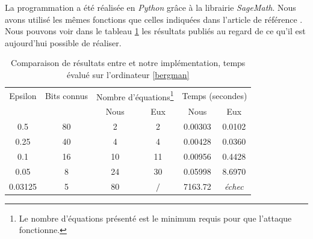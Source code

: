 \documentclass{backend}
\begin{document}
\medbreak

La programmation a été réalisée en \textit{Python} grâce à la librairie \textit{SageMath}. Nous avons utilisé les mêmes fonctions que celles indiquées dans l'article de référence \cite{latAtk}. Nous pouvons voir dans le tableau \ref{tab:comparaison_signatures} les résultats publiés au regard de ce qu'il est aujourd'hui possible de réaliser.

\begin{center}
    \begin{table}[H]
        \centering
        \caption{Comparaison de résultats entre \cite{latAtk} et notre implémentation, temps évalué sur l'ordinateur \ref{bergman} }
        \label{tab:comparaison_signatures}
        
        \begin{tabular}{|c|c|cc|cc|}
            \toprule
            Epsilon & Bits connus & \multicolumn{2}{|c|}{Nombre d'équations\footnote{Le nombre d'équations présenté est le minimum requis pour que l'attaque fonctionne.}} & \multicolumn{2}{|c|}{Temps (secondes)} \\
            \cmidrule{3-6}
            && Nous & Eux & Nous & Eux \\
            \midrule
                0.5   & 80 & 2  & 2  & 0.00303  & 0.0102  \\
                0.25  & 40 & 4  & 4  & 0.00428  & 0.0360 \\
                0.1   & 16 & 10 & 11 & 0.00956  & 0.4428 \\
                0.05  & 8  & 24 & 30 & 0.05998 & 8.6970 \\
                0.03125 & 5  & 80 & $/$  & 7163.72 & \textit{échec} \\
            \bottomrule
        \end{tabular}
    \end{table}
\end{center}


\end{document}

